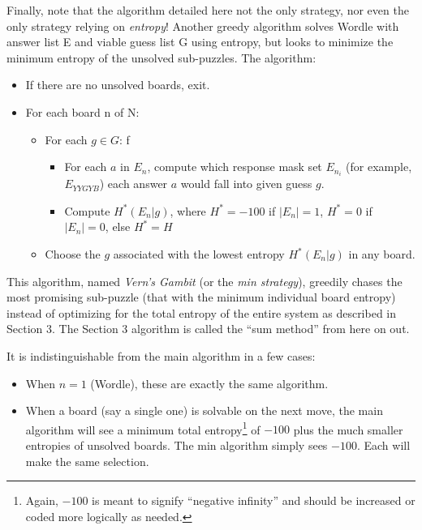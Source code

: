 \documentclass[11pt, oneside]{article} 	%
\begin{document}
Finally, note that the algorithm detailed here not the only strategy, nor even the only strategy relying on \emph{entropy}! Another greedy algorithm solves Wordle with answer list E and viable guess list G using entropy, but looks to minimize the minimum entropy of the unsolved sub-puzzles.  The algorithm:
\begin{itemize}
\item If there are no unsolved boards, exit.
\item For each board n of N:
 \begin{itemize}
 \item For each $g \in G$: f
 \begin{itemize}
 \item For each $a$ in $E_n$, compute which response mask set $E_{n_i}$ (for example, $E_{YYGYB}$) each answer $a$ would fall into given guess $g$.
 \item Compute $H^*(E_n | g)$, where $H^* = -100$ if $|E_n| = 1$, $H^* = 0$ if $|E_n| = 0$, else $H^* = H$ 
 \end{itemize}
 \item Choose the $g$ associated with the lowest entropy $H^*(E_n | g)$ in any board. 
\end{itemize}
\end{itemize}

This algorithm, named \emph{Vern's Gambit} (or the \emph{min strategy}), greedily chases the most promising sub-puzzle (that with the minimum individual board entropy) instead of optimizing for the total entropy of the entire system as described in Section 3. The Section 3 algorithm is called the ``sum method'' from here on out.

It is indistinguishable from the main algorithm in a few cases:
\begin{itemize}
\item When $n = 1$ (Wordle), these are exactly the same algorithm.
\item When a board (say a single one) is solvable on the next move, the main algorithm will see a minimum total entropy\footnote{Again, $-100$ is meant to signify ``negative infinity'' and should be increased or coded more logically as needed.}  of $-100$ plus the much smaller entropies of unsolved boards. The min algorithm simply sees $-100$. Each will make the same selection.
\end{itemize}
\end{document}
